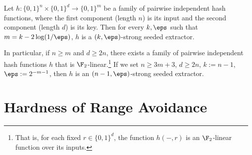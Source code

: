 \begin{theorem}\label{thm:lhl}
	Let $h: \{0, 1\}^n \times \{0, 1\}^d \to \{0, 1\}^m$ be a family of pairwise independent hash functions, where the first component (length $n$) is its input and the second component (length $d$) is its key. Then for every $k, \eps$ such that $m = k - 2\log(1/\eps)$, $h$ is a $(k, \eps)$-strong seeded extractor.

    In particular, if $n\geq m$ and $d\geq 2n$, there exists a family of pairwise independent hash functions $h$ that is $\F_2$-linear.\footnote{That is, for each fixed $r\in \{0, 1\}^d$, the function $h(-, r)$ is an $\F_2$-linear function over its inputs.} If we set $n\geq 3m+3$, $d\geq 2n$, $k:=n-1$, $\eps := 2^{-m-1}$, then $h$ is an $(n-1, \eps)$-strong seeded extractor.
\end{theorem}


\section{Hardness of Range Avoidance}\label{sec: Avoid notin FP}


